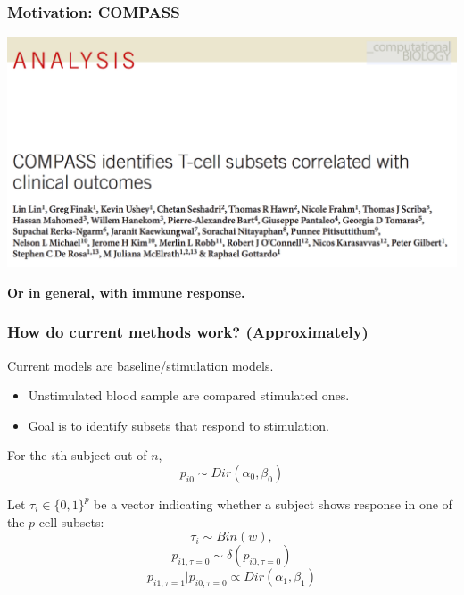 \documentclass{beamer}
\theoremstyle{definition}
\begin{document}
\begin{frame}
\frametitle{Motivation: COMPASS}
\begin{center}
\includegraphics[scale=0.18]{figures/compassCaption}
\end{center}

\pause
\textbf{Or in general, with immune response.}
\end{frame}


\begin{frame}
\frametitle{How do current methods work? (Approximately)}
Current models are baseline/stimulation models. 
\begin{itemize}
\item  Unstimulated blood sample are compared stimulated ones.
\item Goal is to identify subsets that respond to stimulation.
\end{itemize}
\vspace{0.3 cm}

\pause
For the $i$th subject out of $n$,
$$
p_{i0} \sim Dir(\alpha_{0},\beta_{0})
$$

\vspace{0.3 cm}
\pause
Let $\tau_i \in \{0,1\}^{p}$ be a vector indicating whether a subject shows response in one of the $p$ cell subsets:
$$
\tau_i \sim Bin(w),
$$$$
p_{i1,\tau = 0} \sim \delta(p_{i0,\tau = 0})
$$$$
p_{i1, \tau = 1} | p_{i0,\tau = 0}  \propto Dir(\alpha_1, \beta_{1})
$$
\end{frame}

\end{document}

